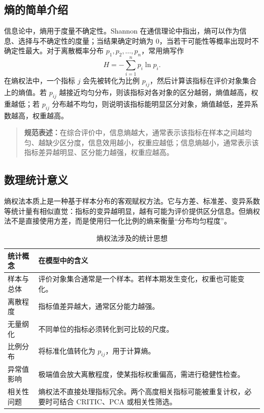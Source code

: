 \documentclass[UTF8,zihao=-4]{ctexart}
\begin{document}
\subsection{熵的简单介绍}
信息论中，熵用于度量不确定性。Shannon 在通信理论中指出，熵可以作为信息、选择与不确定性的度量；当结果确定时熵为 0，当若干可能性等概率出现时不确定性最大\cite{shannon1948}。对于离散概率分布 $p_1,p_2,\dots,p_n$，常用熵写作
\begin{equation}
H=-\sum_{i=1}^{n}p_i\ln p_i.
\end{equation}
在熵权法中，一个指标 $j$ 会先被转化为比例 $p_{ij}$，然后计算该指标在评价对象集合上的熵值。若 $p_{ij}$ 越接近均匀分布，则该指标对各对象的区分越弱，熵值越高，权重越低；若 $p_{ij}$ 分布越不均匀，则说明该指标能明显区分对象，熵值越低，差异系数越高，权重越高。

\begin{quote}
\textbf{规范表述：}在综合评价中，信息熵越大，通常表示该指标在样本之间越均匀、越缺少区分度，信息效用越小，权重应越低；信息熵越小，通常表示该指标差异越明显、区分能力越强，权重应越高。
\end{quote}

\subsection{数理统计意义}
熵权法本质上是一种基于样本分布的客观赋权方法。它与方差、标准差、变异系数等统计量有相似直觉：指标的变异越明显，越有可能为评价提供区分信息。但熵权法不是直接使用方差，而是使用归一化比例的熵来衡量“分布均匀程度”。

\begin{table}[H]
\centering
\caption{熵权法涉及的统计思想}
\begin{tabularx}{\textwidth}{p{3.2cm}X}
\toprule
统计概念 & 在模型中的含义 \\
\midrule
样本与总体 & 评价对象集合通常是一个样本。若样本期发生变化，权重也可能变化。 \\
离散程度 & 指标值差异越大，通常区分能力越强。 \\
无量纲化 & 不同单位的指标必须转化到可比较的尺度。 \\
比例分布 & 将标准化值转化为 $p_{ij}$，用于计算熵。 \\
异常值影响 & 极端值会放大离散程度，使某指标权重偏高，需进行稳健性检查。 \\
相关性问题 & 熵权法不直接处理指标冗余。两个高度相关指标可能被重复计权，必要时可结合 CRITIC、PCA 或相关性筛选。 \\
\bottomrule
\end{tabularx}
\end{table}
\end{document}
